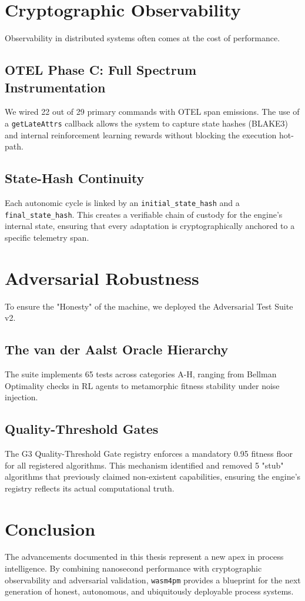 \documentclass[12pt,a4paper]{report}
\begin{document}
\chapter{Cryptographic Observability}
Observability in distributed systems often comes at the cost of performance.

\section{OTEL Phase C: Full Spectrum Instrumentation}
We wired 22 out of 29 primary commands with OTEL span emissions. The use of a \texttt{getLateAttrs} callback allows the system to capture state hashes (BLAKE3) and internal reinforcement learning rewards without blocking the execution hot-path.

\section{State-Hash Continuity}
Each autonomic cycle is linked by an \texttt{initial\_state\_hash} and a \texttt{final\_state\_hash}. This creates a verifiable chain of custody for the engine's internal state, ensuring that every adaptation is cryptographically anchored to a specific telemetry span.

\chapter{Adversarial Robustness}
To ensure the "Honesty" of the machine, we deployed the Adversarial Test Suite v2.

\section{The van der Aalst Oracle Hierarchy}
The suite implements 65 tests across categories A-H, ranging from Bellman Optimality checks in RL agents to metamorphic fitness stability under noise injection.

\section{Quality-Threshold Gates}
The G3 Quality-Threshold Gate registry enforces a mandatory 0.95 fitness floor for all registered algorithms. This mechanism identified and removed 5 "stub" algorithms that previously claimed non-existent capabilities, ensuring the engine's registry reflects its actual computational truth.

\chapter{Conclusion}
The advancements documented in this thesis represent a new apex in process intelligence. By combining nanosecond performance with cryptographic observability and adversarial validation, \texttt{wasm4pm} provides a blueprint for the next generation of honest, autonomous, and ubiquitously deployable process systems.
\end{document}
